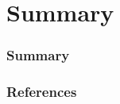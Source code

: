 \documentclass[]{beamer}
\title{}
\author[SuXing~pysuxing@gmail.com]{SuXing}
\institute{TOW}
\date{\today}
\begin{document}
\setlength{\parindent}{0pt}

\frame{\titlepage}
\frame{\tableofcontents}

\section{}
\frame{\tableofcontents[currentsection]}

\begin{frame}
  \frametitle{}
\end{frame}

\section{}
\frame{\tableofcontents[currentsection]}

\begin{frame}
  \frametitle{}
\end{frame}

\section{}
\frame{\tableofcontents[currentsection]}

\begin{frame}
  \frametitle{}
\end{frame}

\section{Summary}
\frame{\tableofcontents[currentsection]}

\begin{frame}
  \frametitle{Summary}
\end{frame}

\begin{frame}
  \frametitle{References}
\end{frame}

\end{document}
